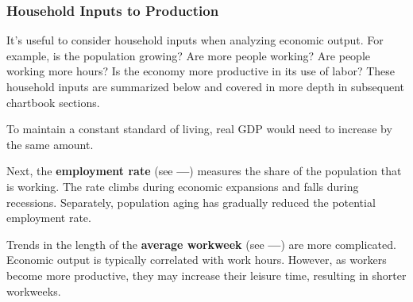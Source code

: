 \documentclass{report}
\begin{document}
\begin{minipage}{0.76\textwidth}
\subsubsection*{Household Inputs to Production}
\small It's useful to consider household inputs when analyzing economic output. For example, is the population growing? Are more people working? Are people working more hours? Is the economy more productive in its use of labor? These household inputs are summarized below and covered in more depth in subsequent chartbook sections.

To maintain a constant standard of living, real GDP would need to increase by the same amount. 

Next, the \textbf{employment rate} (see {\color{green!30!teal!80!black}\textbf{---}}) measures the share of the population that is working. The rate climbs during economic expansions and falls during recessions. Separately, population aging has gradually reduced the potential employment rate. 

Trends in the length of the \textbf{average workweek} (see {\color{blue}\textbf{---}}) are more complicated. Economic output is typically correlated with work hours. However, as workers become more productive, they may increase their leisure time, resulting in shorter workweeks. 
\vspace{2mm}


\end{minipage}
\end{document}
